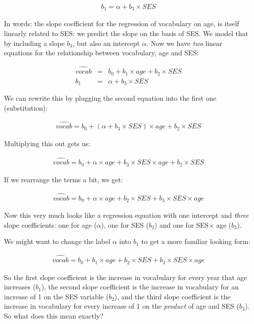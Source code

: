 \documentclass[]{report}\usepackage[]{graphicx}\usepackage[]{color}
\begin{document}
\begin{eqnarray}
b_1 = \alpha + b_3 \times SES
\end{eqnarray}

In words: the slope coefficient for the regression of vocabulary on age, is itself linearly related to SES: we predict the slope on the basis of SES. We model that by including a slope $b_3$, but also an intercept $\alpha$. Now we have \textit{two} linear equations for the relationship between vocabulary, age and SES:

\begin{eqnarray}
\widehat{vocab} &=& b_0 + b_1 \times age + b_2 \times SES  \\
b_1 &=& \alpha + b_3 \times SES
\end{eqnarray}

We can rewrite this by plugging the second equation into the first one (substitution):

\begin{eqnarray}
\widehat{vocab} = b_0 + (\alpha + b_3 \times SES)  \times age + b_2 \times SES 
\end{eqnarray}


Multiplying this out gets us:

\begin{eqnarray}
\widehat{vocab} = b_0 + \alpha \times age + b_3 \times SES  \times age + b_2 \times SES
\end{eqnarray}

If we rearrange the terms a bit, we get:

\begin{eqnarray}
\widehat{vocab} = b_0 + \alpha \times age + b_2 \times SES + b_3 \times SES  \times age
\end{eqnarray}

Now this very much looks like a regression equation with one intercept and \textit{three} slope coefficients: one for age ($\alpha$), one for SES ($b_2$) and one for SES$\times$ age ($b_3$).


We might want to change the label $\alpha$ into $b_1$ to get a more familiar looking form:

\begin{eqnarray}
\widehat{vocab} = b_0 + b_1\times age + b_2 \times SES + b_3 \times SES  \times age
\end{eqnarray}

So the first slope coefficient is the increase in vocabulary for every year that age increases ($b_1$), the second slope coefficient is the increase in vocabulary for an increase of 1 on the SES variable ($b_2$), and the third slope coefficient is the increase in vocabulary for every increase of 1 on the \textit{product} of age and SES ($b_3$).
\\
So what does this mean exactly?
\end{document}
